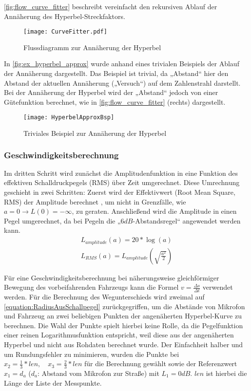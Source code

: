 \autoref{fig:flow_curve_fitter} beschreibt vereinfacht den rekursiven Ablauf der Annäherung des Hyperbel-Streckfaktors.

\begin{figure}[h]
    \centering
    \texttt{[image: CurveFitter.pdf]}
    \caption{Flussdiagramm zur Annäherung der Hyperbel}
    \label{fig:flow_curve_fitter}
\end{figure}

In \autoref{fig:ex_hyperbel_approx} wurde anhand eines trivialen Beispiels der Ablauf der Annäherung dargestellt. Das Beispiel ist trivial, da „Abstand“ hier den Abstand der aktuellen Annäherung („Versuch“) auf dem Zahlenstrahl darstellt. Bei der Annäherung der Hyperbel wird der „Abstand“ jedoch von einer Gütefunktion berechnet, wie in \autoref{fig:flow_curve_fitter} (rechts) dargestellt.

\begin{figure}[h]
    \centering
    \texttt{[image: HyperbelApproxBsp]}
    \caption{Triviales Beispiel zur Annäherung der Hyperbel}
    \label{fig:ex_hyperbel_approx}
\end{figure}

\FloatBarrier
\subsubsection{Geschwindigkeitsberechnung}
Im dritten Schritt wird zunächst die Amplitudenfunktion in eine Funktion des effektiven Schalldruckpegels (RMS) über Zeit umgerechnet. Diese Umrechnung geschieht in zwei Schritten: Zuerst wird der Effektivwert (Root Mean Square, RMS) der Amplitude berechnet \cite{SiemensRMS}, um nicht in Grenzfälle, wie \(a = 0 \longrightarrow L(0) = -\infty\), zu geraten. Anschließend wird die Amplitude in einen Pegel umgerechnet, da bei Pegeln die „\(6 dB\)-Abstandsregel“ angewendet werden kann.
\begin{equation}
    \begin{split}
        L_{amplitude}(a) = 20 * \log(a) \\
        L_{RMS}(a) = L_{amplitude}\left(\sqrt{\frac{a^2}{2}}\right)
    \end{split}
    \label{equation:LRMS}
\end{equation}

Für eine Geschwindigkeitsberechnung bei näherungsweise gleichförmiger Bewegung des vorbeifahrenden Fahrzeugs kann die Formel \(v = \frac{\Delta s}{\Delta t}\) verwendet werden. Für die Berechnung des Wegunterschieds wird zweimal auf \autoref{equation:RadiusAusSchallpegel} zurückgegriffen, um die Abstände von Mikrofon und Fahrzeug an zwei beliebigen Punkten der angenäherten Hyperbel-Kurve zu berechnen. Die Wahl der Punkte spielt hierbei keine Rolle, da die Pegelfunktion einer reinen Logarithmusfunktion entspricht, weil diese aus der angenäherten Hyperbel und nicht aus Rohdaten berechnet wurde. Der Einfachheit halber und um Rundungsfehler zu minimieren, wurden die Punkte bei \(x_{2} = \frac{1}{3} * len, \quad x_{3} = \frac{2}{3} * len\) für die Berechnung gewählt sowie der Referenzwert \(x_{1} = d_{a}\) (\(d_{a}\): Abstand vom Mikrofon zur Straße) mit \(L_{1} = 0 dB\). \(len\) ist hierbei die Länge der Liste der Messpunkte.

